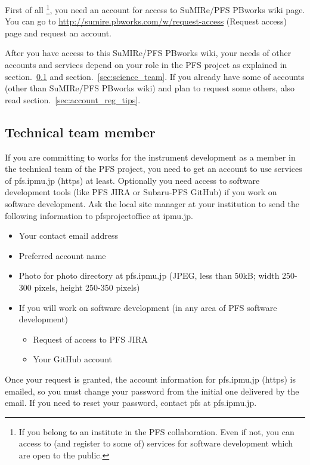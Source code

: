 \documentclass[a4paper,notitlepage]{article}
\begin{document}
First of all
\footnote{If you belong to an institute in the PFS collaboration. Even if not, 
you can access to (and register to some of) services for software development 
which are open to the public.}, 
you need an account for access to SuMIRe/PFS PBworks wiki page. 
You can go to \url{http://sumire.pbworks.com/w/request-access} (Request access) 
page and request an account. 

After you have access to this SuMIRe/PFS PBworks wiki, your needs of other 
accounts and services depend on your role in the PFS project as explained 
in section.~\ref{sec:technical_team} and section.~\ref{sec:science_team}. 
If you already have some of accounts (other than SuMIRe/PFS PBworks wiki) 
and plan to request some others, also read section.~\ref{sec:account_reg_tips}. 

\subsection{Technical team member}
\label{sec:technical_team}

If you are committing to works for the instrument development as a member 
in the technical team of the PFS project, you need to get an account to use 
services of pfs.ipmu.jp (https) at least. Optionally you need access to 
software development tools (like PFS JIRA or Subaru-PFS GitHub) if you work 
on software development. Ask the local site manager at your institution 
to send the following information to pfsprojectoffice at ipmu.jp.

\begin{itemize}
  \item Your contact email address
  \item Preferred account name
  \item Photo for photo directory at pfs.ipmu.jp
    (JPEG, less than 50kB; width 250-300 pixels, height 250-350 pixels)
  \item If you will work on software development (in any area of PFS software 
    development) 
    \begin{itemize}
      \item Request of access to PFS JIRA
      \item Your GitHub account
    \end{itemize}
\end{itemize}

Once your request is granted, the account information for pfs.ipmu.jp (https) 
is emailed, so you must change your password from the initial one delivered 
by the email. If you need to reset your password, contact pfs at pfs.ipmu.jp.
\end{document}

